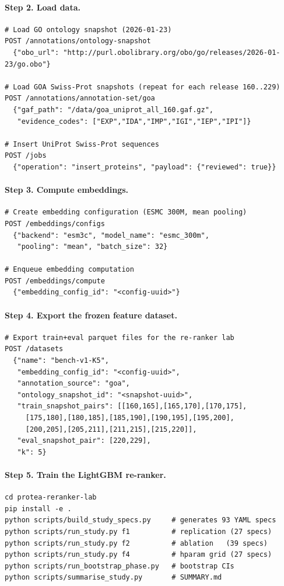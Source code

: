 \paragraph{Step 2. Load data.}
\begin{verbatim}
# Load GO ontology snapshot (2026-01-23)
POST /annotations/ontology-snapshot
  {"obo_url": "http://purl.obolibrary.org/obo/go/releases/2026-01-23/go.obo"}

# Load GOA Swiss-Prot snapshots (repeat for each release 160..229)
POST /annotations/annotation-set/goa
  {"gaf_path": "/data/goa_uniprot_all_160.gaf.gz",
   "evidence_codes": ["EXP","IDA","IMP","IGI","IEP","IPI"]}

# Insert UniProt Swiss-Prot sequences
POST /jobs
  {"operation": "insert_proteins", "payload": {"reviewed": true}}
\end{verbatim}

\paragraph{Step 3. Compute embeddings.}
\begin{verbatim}
# Create embedding configuration (ESMC 300M, mean pooling)
POST /embeddings/configs
  {"backend": "esm3c", "model_name": "esmc_300m",
   "pooling": "mean", "batch_size": 32}

# Enqueue embedding computation
POST /embeddings/compute
  {"embedding_config_id": "<config-uuid>"}
\end{verbatim}

\paragraph{Step 4. Export the frozen feature dataset.}
\begin{verbatim}
# Export train+eval parquet files for the re-ranker lab
POST /datasets
  {"name": "bench-v1-K5",
   "embedding_config_id": "<config-uuid>",
   "annotation_source": "goa",
   "ontology_snapshot_id": "<snapshot-uuid>",
   "train_snapshot_pairs": [[160,165],[165,170],[170,175],
     [175,180],[180,185],[185,190],[190,195],[195,200],
     [200,205],[205,211],[211,215],[215,220]],
   "eval_snapshot_pair": [220,229],
   "k": 5}
\end{verbatim}

\paragraph{Step 5. Train the LightGBM re-ranker.}
\begin{verbatim}
cd protea-reranker-lab
pip install -e .
python scripts/build_study_specs.py     # generates 93 YAML specs
python scripts/run_study.py f1          # replication (27 specs)
python scripts/run_study.py f2          # ablation   (39 specs)
python scripts/run_study.py f4          # hparam grid (27 specs)
python scripts/run_bootstrap_phase.py   # bootstrap CIs
python scripts/summarise_study.py       # SUMMARY.md
\end{verbatim}

